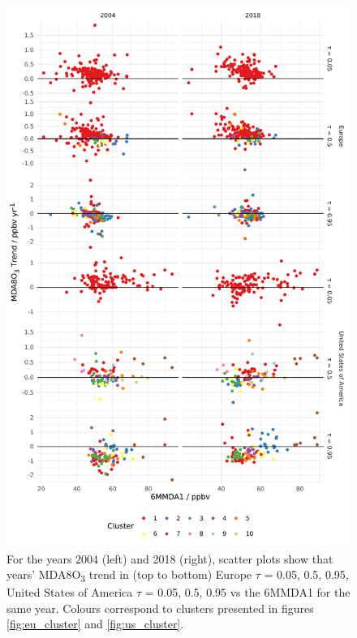 \documentclass[journal abbreviation, manuscript]{copernicus}
\begin{document}
\clearpage


\begin{figure}[p]
\centering
\includegraphics[height=0.9\textheight]{figures/paper_figures/f09_mda8_cluster_mda8_6mmda1.pdf}
\caption{For the years 2004 (left) and 2018 (right), scatter plots show that years' MDA8O\textsubscript{3} trend in (top to bottom) Europe $\tau$ = 0.05, 0.5, 0.95, United States of America $\tau$ = 0.05, 0.5, 0.95 vs the 6MMDA1 for the same year. Colours correspond to clusters presented in figures \ref{fig:eu_cluster} and \ref{fig:us_cluster}.}
\label{fig:mda8_cluster_mda8_6mmda1}
\end{figure}
\clearpage
\end{document}
